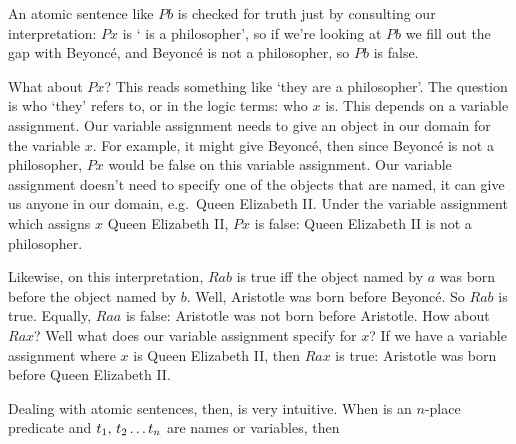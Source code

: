 An atomic sentence like $Pb$ is checked for truth just by consulting our interpretation: $Px$ is ` is a philosopher', so if we're looking at $Pb$ we fill out the gap with  Beyonc\'e, and  Beyonc\'e is not a philosopher, so $Pb$ is false. 

What about $Px$? This reads something like `they are a philosopher'. The question is who `they' refers to, or in the logic terms: who $x$ is. This depends on a variable assignment. Our variable assignment needs to give an object in our domain for the variable $x$. For example, it might give Beyonc\'e, then since Beyonc\'e is not a philosopher, $Px$ would be false on this variable assignment. Our variable assignment doesn't need to specify one of the objects that are named, it can give us anyone in our domain, e.g.~Queen Elizabeth II. Under the variable assignment which assigns $x$ Queen Elizabeth II, $Px$ is false: Queen Elizabeth II is not a philosopher. 


Likewise, on this interpretation, $Rab$ is true iff the object named by $a$ was born before the object named by $b$. Well, Aristotle was born before Beyonc\'e. So $Rab$ is true. Equally, $Raa$ is false: Aristotle was not born before Aristotle. How about $Rax$? Well what does our variable assignment specify for $x$? If we have a variable assignment where $x$ is Queen Elizabeth II, then $Rax$ is true: Aristotle was born before Queen Elizabeth II. 

Dealing with atomic sentences, then, is very intuitive. When  is an $n$-place predicate and $t_1,\,t_2\ldots t_{n}$ are names or variables, then




